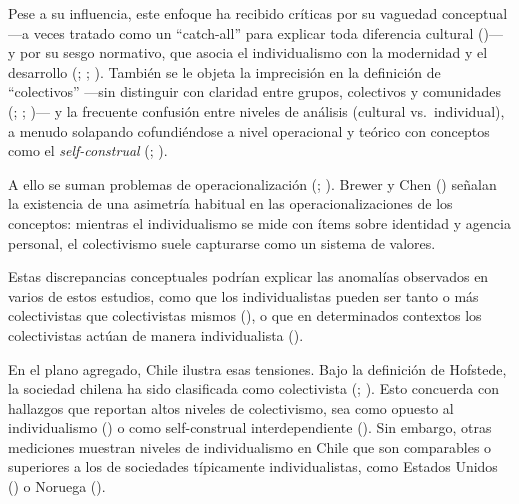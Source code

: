 \documentclass[
  12pt,
  letterpaper,
  DIV=11,
  numbers=noendperiod]{scrartcl}
\begin{document}
Pese a su influencia, este enfoque ha recibido críticas por su vaguedad
conceptual ---a veces tratado como un ``catch-all'' para explicar toda
diferencia cultural ()--- y por su sesgo normativo, que asocia el individualismo con la
modernidad y el desarrollo (; ;
). También se le objeta la
imprecisión en la definición de ``colectivos'' ---sin distinguir con
claridad entre grupos, colectivos y comunidades
(;
;
)--- y la frecuente
confusión entre niveles de análisis (cultural vs.~individual), a menudo
solapando cofundiéndose a nivel operacional y teórico con conceptos como
el \emph{self-construal} (;
).

A ello se suman problemas de operacionalización
(;
). Brewer y Chen
() señalan la existencia de una asimetría
habitual en las operacionalizaciones de los conceptos: mientras el
individualismo se mide con ítems sobre identidad y agencia personal, el
colectivismo suele capturarse como un sistema de valores.

Estas discrepancias conceptuales podrían explicar las anomalías
observados en varios de estos estudios, como que los individualistas
pueden ser tanto o más colectivistas que colectivistas mismos
(), o que en
determinados contextos los colectivistas actúan de manera individualista
().

En el plano agregado, Chile ilustra esas tensiones. Bajo la definición
de Hofstede, la sociedad chilena ha sido clasificada como colectivista
(;
). Esto concuerda con
hallazgos que reportan altos niveles de colectivismo, sea como opuesto
al individualismo () o
como self-construal interdependiente
(). Sin embargo,
otras mediciones muestran niveles de individualismo en Chile que son
comparables o superiores a los de sociedades típicamente
individualistas, como Estados Unidos
() o Noruega
().
\end{document}
